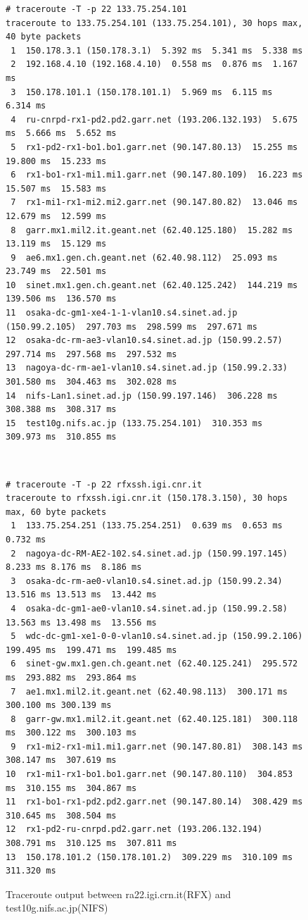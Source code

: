 \documentclass[10pt,a4paper]{article}
\begin{document}
\begin{figure}[htbp!]
\begin{minipage}{.5\textwidth}
{ \tiny \begin{verbatim}
# traceroute -T -p 22 133.75.254.101
traceroute to 133.75.254.101 (133.75.254.101), 30 hops max, 40 byte packets
 1  150.178.3.1 (150.178.3.1)  5.392 ms  5.341 ms  5.338 ms
 2  192.168.4.10 (192.168.4.10)  0.558 ms  0.876 ms  1.167 ms
 3  150.178.101.1 (150.178.101.1)  5.969 ms  6.115 ms  6.314 ms
 4  ru-cnrpd-rx1-pd2.pd2.garr.net (193.206.132.193)  5.675 ms  5.666 ms  5.652 ms
 5  rx1-pd2-rx1-bo1.bo1.garr.net (90.147.80.13)  15.255 ms  19.800 ms  15.233 ms
 6  rx1-bo1-rx1-mi1.mi1.garr.net (90.147.80.109)  16.223 ms  15.507 ms  15.583 ms
 7  rx1-mi1-rx1-mi2.mi2.garr.net (90.147.80.82)  13.046 ms  12.679 ms  12.599 ms
 8  garr.mx1.mil2.it.geant.net (62.40.125.180)  15.282 ms  13.119 ms  15.129 ms
 9  ae6.mx1.gen.ch.geant.net (62.40.98.112)  25.093 ms  23.749 ms  22.501 ms
10  sinet.mx1.gen.ch.geant.net (62.40.125.242)  144.219 ms  139.506 ms  136.570 ms
11  osaka-dc-gm1-xe4-1-1-vlan10.s4.sinet.ad.jp (150.99.2.105)  297.703 ms  298.599 ms  297.671 ms
12  osaka-dc-rm-ae3-vlan10.s4.sinet.ad.jp (150.99.2.57)  297.714 ms  297.568 ms  297.532 ms
13  nagoya-dc-rm-ae1-vlan10.s4.sinet.ad.jp (150.99.2.33)  301.580 ms  304.463 ms  302.028 ms
14  nifs-Lan1.sinet.ad.jp (150.99.197.146)  306.228 ms  308.388 ms  308.317 ms
15  test10g.nifs.ac.jp (133.75.254.101)  310.353 ms  309.973 ms  310.855 ms
\end{verbatim} }
\end{minipage} 
~
\begin{minipage}{.5\textwidth}
{ \tiny \begin{verbatim}
# traceroute -T -p 22 rfxssh.igi.cnr.it
traceroute to rfxssh.igi.cnr.it (150.178.3.150), 30 hops max, 60 byte packets
 1  133.75.254.251 (133.75.254.251)  0.639 ms  0.653 ms  0.732 ms
 2  nagoya-dc-RM-AE2-102.s4.sinet.ad.jp (150.99.197.145)  8.233 ms 8.176 ms  8.186 ms
 3  osaka-dc-rm-ae0-vlan10.s4.sinet.ad.jp (150.99.2.34)  13.516 ms 13.513 ms  13.442 ms
 4  osaka-dc-gm1-ae0-vlan10.s4.sinet.ad.jp (150.99.2.58)  13.563 ms 13.498 ms  13.556 ms
 5  wdc-dc-gm1-xe1-0-0-vlan10.s4.sinet.ad.jp (150.99.2.106)  199.495 ms  199.471 ms  199.485 ms
 6  sinet-gw.mx1.gen.ch.geant.net (62.40.125.241)  295.572 ms  293.882 ms  293.864 ms
 7  ae1.mx1.mil2.it.geant.net (62.40.98.113)  300.171 ms  300.100 ms 300.139 ms
 8  garr-gw.mx1.mil2.it.geant.net (62.40.125.181)  300.118 ms  300.122 ms  300.103 ms
 9  rx1-mi2-rx1-mi1.mi1.garr.net (90.147.80.81)  308.143 ms  308.147 ms  307.619 ms
10  rx1-mi1-rx1-bo1.bo1.garr.net (90.147.80.110)  304.853 ms  310.155 ms  304.867 ms
11  rx1-bo1-rx1-pd2.pd2.garr.net (90.147.80.14)  308.429 ms  310.645 ms  308.504 ms
12  rx1-pd2-ru-cnrpd.pd2.garr.net (193.206.132.194)  308.791 ms  310.125 ms  307.811 ms
13  150.178.101.2 (150.178.101.2)  309.229 ms  310.109 ms  311.320 ms
\end{verbatim} }
\end{minipage} 
\caption{Traceroute output between ra22.igi.crn.it(RFX) and test10g.nifs.ac.jp(NIFS) }  
\label{fig:hops}
\end{figure}
\end{document}
